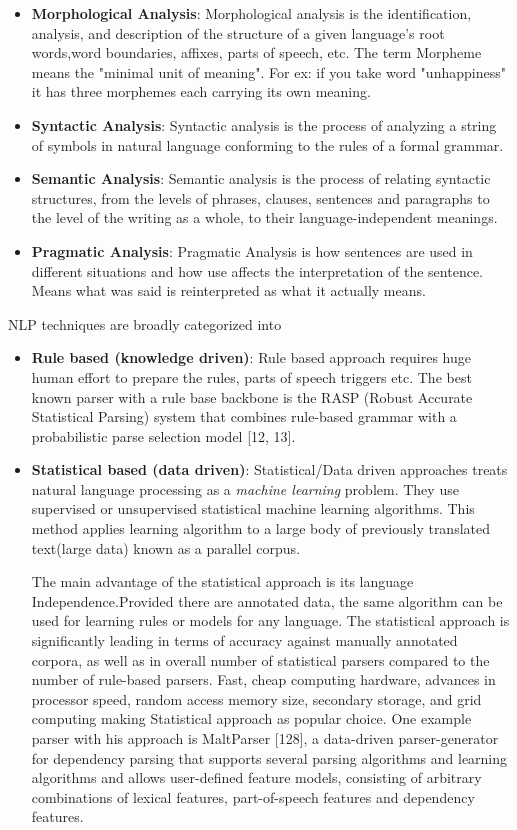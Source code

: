 \documentclass[sigconf]{acmart}
\begin{document}
  \begin{itemize}
     \item \textbf{Morphological Analysis}:
     Morphological analysis is the identification, analysis, and description of the structure of a given language’s root words,word boundaries, affixes, parts of speech, etc. The term Morpheme means the "minimal unit of meaning". For ex: if you take word "unhappiness" it has three morphemes each carrying its own meaning.
     \item \textbf{Syntactic Analysis}:
     Syntactic analysis is the process of analyzing a string of symbols in natural language conforming to the rules of a formal grammar.
     \item \textbf{Semantic Analysis}:
     Semantic analysis is the process of relating syntactic structures, from the levels of phrases, clauses, sentences and paragraphs to the level of the writing as a whole, to their language-independent meanings.
     \item \textbf{Pragmatic Analysis}:
     Pragmatic Analysis is how sentences are used in different situations and how use affects the interpretation of the sentence. Means what was said is reinterpreted as what it actually means.
  \end{itemize}

NLP techniques are broadly categorized into 

  \begin{itemize}
   \item \textbf{Rule based (knowledge driven)}:
   Rule based approach requires huge human effort to prepare the rules, parts of speech triggers etc. The  best  known  parser  with  a  rule  base  backbone  is  the  RASP  (Robust Accurate Statistical Parsing) system that combines rule-based grammar with a probabilistic parse selection model [12, 13].
   \item \textbf{Statistical based (data driven)}:
   Statistical/Data driven approaches treats natural language processing as a \textit{machine learning} problem. They use supervised or unsupervised statistical machine learning algorithms. This method applies learning algorithm to a large body of previously translated text(large data) known as a parallel corpus. 
   
   The main advantage of the statistical approach is its language Independence.Provided there are annotated data, the same algorithm can be used for learning rules or models for any language. The statistical approach is significantly  leading in terms of accuracy against manually annotated corpora, as well as in overall number of statistical parsers compared to the number of rule-based parsers. Fast, cheap computing hardware, advances in processor speed, random access memory size, secondary storage, and grid computing making Statistical approach as popular choice. One example parser with his approach is MaltParser [128], a data-driven parser-generator for dependency parsing  that  supports  several  parsing  algorithms  and  learning  algorithms and allows user-defined feature models, consisting of arbitrary combinations of lexical features, part-of-speech features and dependency features.
  \end{itemize} 
\end{document}
